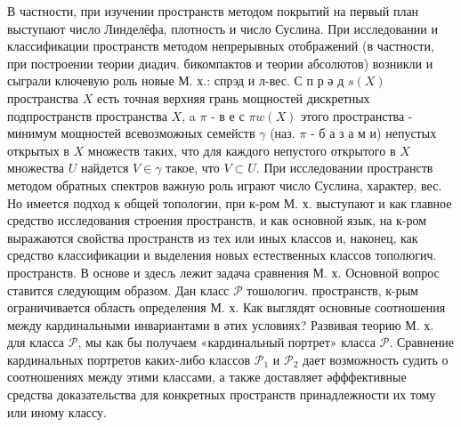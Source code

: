 \documentclass[10pt]{article}
\begin{document}
В частности, при изучении пространств методом покрытий на первый план выступают число Линделёфа, плотность и число Суслина. При исследовании и классификации пространств методом непрерывных отображений (в частности, при построении теории диадич. бикомпактов и теории абсолютов) возникли и сыграли ключевую роль новые М. х.: спрэд и л-вес. С п р ә д $s(X)$ пространства $X$ есть точная верхняя грань мощностей дискретных подпространств пространства $X$, a $\pi$ - в е с $\pi w(X)$ этого пространства - минимум мощностей всевозможных семейств $\gamma$ (наз. $\pi$ - б а з а м и) непустых открытых в $X$ множеств таких, что для каждого непустого открытого в $X$ множества $U$ найдется $V \in \gamma$ такое, что $V \subset U$. При исследовании пространств методом обратных спектров важную роль играют число Суслина, характер, вес. Но имеется подход к общей топологии, при к-ром М. х. выступают и как главное средство исследования строения пространств, и как основной язык, на к-ром выражаются свойства пространств из тех или иных классов и, наконец, как средство классификации и выделения новых естественных классов тополюгич. пространств. В основе и здесљ лежит задача сравнения М. х. Основной вопрос ставится следующим образом. Дан класс $\mathscr{P}$ тошологич. пространств, к-рым ограничивается область определения М. х. Как выглядят основные соотношения между кардинальными инвариантами в әтих условиях? Развивая теорию М. х. для класса $\mathscr{P}$, мы как бы получаем «кардинальный портрет» класса $\mathscr{P}$. Сравнение кардинальных портретов каких-либо классов $\mathscr{P}_{1}$ и $\mathscr{P}_{2}$ дает возможность судить о соотношениях между этими классами, а также доставляет әфффективные средства доказательства для конкретных пространств принадлежности их тому или иному классу.
\end{document}
